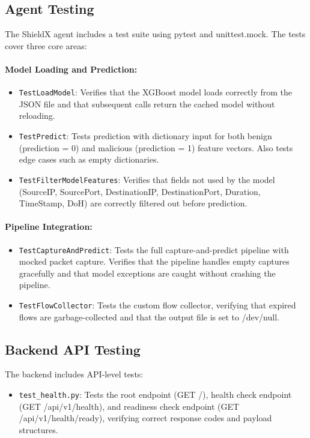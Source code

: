\documentclass[../Main.tex]{subfiles}
\begin{document}
\subsection{Agent Testing}

The ShieldX agent includes a test suite using pytest and unittest.mock. The tests cover three core areas:

\paragraph{Model Loading and Prediction:}
\begin{itemize}
    \item \texttt{TestLoadModel}: Verifies that the XGBoost model loads correctly from the JSON file and that subsequent calls return the cached model without reloading.
    \item \texttt{TestPredict}: Tests prediction with dictionary input for both benign (prediction = 0) and malicious (prediction = 1) feature vectors. Also tests edge cases such as empty dictionaries.
    \item \texttt{TestFilterModelFeatures}: Verifies that fields not used by the model (SourceIP, SourcePort, DestinationIP, DestinationPort, Duration, TimeStamp, DoH) are correctly filtered out before prediction.
\end{itemize}

\paragraph{Pipeline Integration:}
\begin{itemize}
    \item \texttt{TestCaptureAndPredict}: Tests the full capture-and-predict pipeline with mocked packet capture. Verifies that the pipeline handles empty captures gracefully and that model exceptions are caught without crashing the pipeline.
    \item \texttt{TestFlowCollector}: Tests the custom flow collector, verifying that expired flows are garbage-collected and that the output file is set to /dev/null.
\end{itemize}

\subsection{Backend API Testing}

The backend includes API-level tests:
\begin{itemize}
    \item \texttt{test\_health.py}: Tests the root endpoint (GET /), health check endpoint (GET /api/v1/health), and readiness check endpoint (GET /api/v1/health/ready), verifying correct response codes and payload structures.
\end{itemize}
\end{document}
